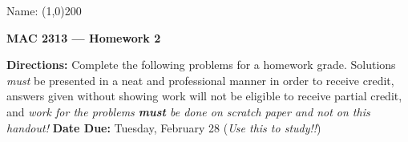 \documentclass[12 pt]{article}
\newcommand{\note}[1]{\textbf{Note}: #1}
\begin{document}
\begin{flushright}Name: \line(1,0){200}\end{flushright}
\begin{center}
\Large{\textbf{MAC 2313 --- Homework 2}}
\end{center}
\textbf{Directions:} Complete the following problems for a homework grade. Solutions \textit{must} be presented in a neat and professional manner in order to receive credit, answers given without showing work will not be eligible to receive partial credit, and \textit{work for the problems \textbf{must} be done on scratch paper and not on this handout!} \textbf{Date Due:} Tuesday, February 28 (\textit{Use this to study!!})
\vspace{0.25in}
\begin{enumerate}[leftmargin=0in, rightmargin=-0.25in]
%				
	

\end{enumerate}
\end{document}
